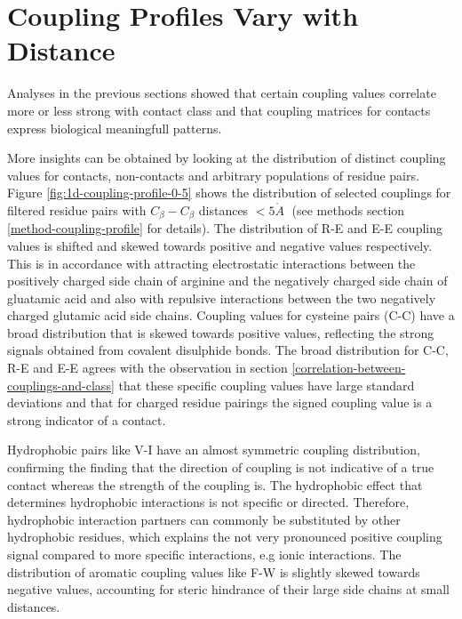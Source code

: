 \documentclass[12pt,a4paper,twoside]{book}
\newcommand{\Cb}{C_\beta}
\newcommand{\angstrom}{\mathring{A} \;}
\theoremstyle{definition}
\theoremstyle{definition}
\theoremstyle{remark}
\begin{document}
\section{Coupling Profiles Vary with
Distance}\label{coupling-profiles-vary-with-distance}

Analyses in the previous sections showed that certain coupling values
correlate more or less strong with contact class and that coupling
matrices for contacts express biological meaningfull patterns.

More insights can be obtained by looking at the distribution of distinct
coupling values for contacts, non-contacts and arbitrary populations of
residue pairs. Figure \ref{fig:1d-coupling-profile-0-5} shows the
distribution of selected couplings for filtered residue pairs with
\(\Cb-\Cb\) distances \(< 5\angstrom\) (see methods section
\ref{method-coupling-profile} for details). The distribution of R-E and
E-E coupling values is shifted and skewed towards positive and negative
values respectively. This is in accordance with attracting electrostatic
interactions between the positively charged side chain of arginine and
the negatively charged side chain of gluatamic acid and also with
repulsive interactions between the two negatively charged glutamic acid
side chains. Coupling values for cysteine pairs (C-C) have a broad
distribution that is skewed towards positive values, reflecting the
strong signals obtained from covalent disulphide bonds. The broad
distribution for C-C, R-E and E-E agrees with the observation in section
\ref{correlation-between-couplings-and-class} that these specific
coupling values have large standard deviations and that for charged
residue pairings the signed coupling value is a strong indicator of a
contact.

Hydrophobic pairs like V-I have an almost symmetric coupling
distribution, confirming the finding that the direction of coupling is
not indicative of a true contact whereas the strength of the coupling
is. The hydrophobic effect that determines hydrophobic interactions is
not specific or directed. Therefore, hydrophobic interaction partners
can commonly be substituted by other hydrophobic residues, which
explains the not very pronounced positive coupling signal compared to
more specific interactions, e.g ionic interactions. The distribution of
aromatic coupling values like F-W is slightly skewed towards negative
values, accounting for steric hindrance of their large side chains at
small distances.
\end{document}
